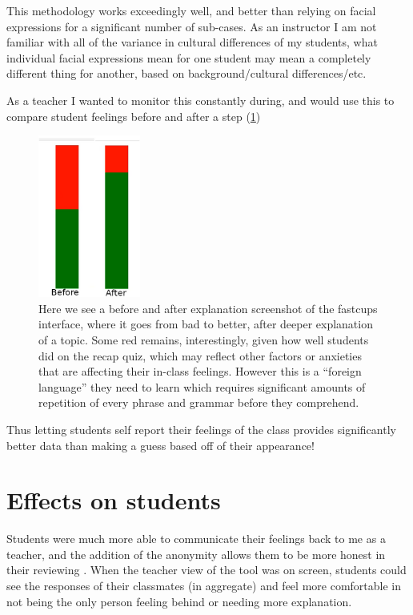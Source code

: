 \documentclass[paper=a4,justified,a4paper]{tufte-handout}
\begin{document}
This methodology works exceedingly well, and better than relying on
facial expressions for a significant number of sub-cases. As an
instructor I am not familiar with all of the variance in cultural
differences of my students, what individual facial expressions mean for
one student may mean a completely different thing for another, based on
background/cultural differences/etc.

As a teacher I wanted to monitor this constantly during, and would use
this to compare student feelings before and after a step (\cref{fig2})

\begin{figure}
\centering
	\includegraphics[width=0.3\textwidth]{bad-better.png}
\caption{Here we see a before and after explanation screenshot of the
fastcups interface, where it goes from bad to better, after deeper
explanation of a topic. Some red remains, interestingly, given how well
students did on the recap quiz, which may reflect other factors or
anxieties that are affecting their in-class feelings. However this is a
``foreign language'' they need to learn which requires significant
amounts of repetition of every phrase and grammar before they
comprehend.\label{fig2}}
\end{figure}

Thus letting students self report their feelings of the class provides
significantly better data than making a guess based off of their
appearance!

\hypertarget{effects-on-students}{%
\section{Effects on students}\label{effects-on-students}}

Students were much more able to communicate their feelings back to me as
a teacher, and the addition of the anonymity allows them to be more
honest in their reviewing \citep{Van_Zant_2014}. When the teacher view
of the tool was on screen, students could see the responses of their
classmates (in aggregate) and feel more comfortable in not being the
only person feeling behind or needing more explanation.
\end{document}
